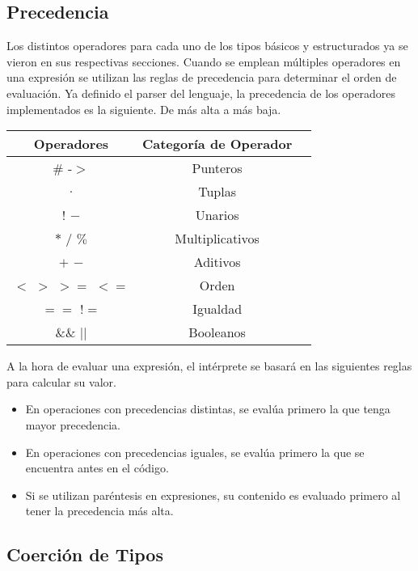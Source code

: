 \documentclass{article}
\begin{document}
\subsection{Precedencia}

Los distintos operadores para cada uno de los tipos básicos y estructurados ya se vieron en sus respectivas secciones.
Cuando se emplean múltiples operadores en una expresión se utilizan las reglas de precedencia para determinar el orden de evaluación.
Ya definido el parser del lenguaje, la precedencia de los operadores implementados es la siguiente. De más alta a más baja.

\begin{center}
\begin{tabular}{| c | c | c |}
\hline
    Operadores & Categoría de Operador  \\
    \hline
    $\#$ -$>$         & Punteros \\
    $.$               & Tuplas \\
    $!$ $-$           & Unarios \\
    $*$ $/$ $\%$      & Multiplicativos \\
    $+$ $-$           & Aditivos \\
    $<$ $>$ $>=$ $<=$ & Orden \\
    $==$ $!=$         & Igualdad \\
    $\&\&$ $||$       & Booleanos \\
\hline
\end{tabular}
\end{center}

A la hora de evaluar una expresión, el intérprete se basará en las siguientes reglas para calcular su valor.

\begin{itemize}

\item
En operaciones con precedencias distintas, se evalúa primero la que tenga mayor precedencia.
\item
En operaciones con precedencias iguales, se evalúa primero la que se encuentra antes en el código.
\item
Si se utilizan paréntesis en expresiones, su contenido es evaluado primero al tener la precedencia más alta.

\end{itemize}

\subsection{Coerción de Tipos}
\end{document}
